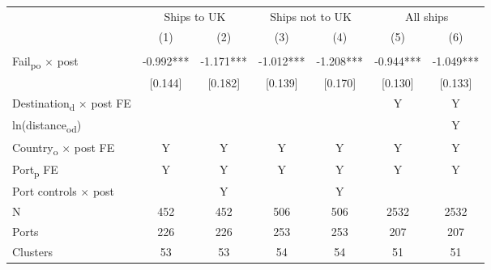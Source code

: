 {
\def\sym#1{\ifmmode^{#1}\else\(^{#1}\)\fi}
\begin{tabular}{l*{6}{c}}
\toprule
            &\multicolumn{2}{c}{Ships to UK}&\multicolumn{2}{c}{Ships not to UK}&\multicolumn{2}{c}{All ships}  \\\cmidrule(lr){2-3}\cmidrule(lr){4-5}\cmidrule(lr){6-7}
            &\multicolumn{1}{c}{(1)}   &\multicolumn{1}{c}{(2)}   &\multicolumn{1}{c}{(3)}   &\multicolumn{1}{c}{(4)}   &\multicolumn{1}{c}{(5)}   &\multicolumn{1}{c}{(6)}   \\
\midrule
            &               &               &               &               &               &               \\
Fail\textsubscript{po} $\times$ post&      -0.992***&      -1.171***&      -1.012***&      -1.208***&      -0.944***&      -1.049***\\
            &     [0.144]   &     [0.182]   &     [0.139]   &     [0.170]   &     [0.130]   &     [0.133]   \\
Destination\textsubscript{d} $\times$ post FE&               &               &               &               &           Y   &           Y   \\
ln(distance\textsubscript{od}) &               &               &               &               &               &           Y   \\
Country\textsubscript{o} $\times$ post FE&           Y   &           Y   &           Y   &           Y   &           Y   &           Y   \\
Port\textsubscript{p} FE &           Y   &           Y   &           Y   &           Y   &           Y   &           Y   \\
Port controls $\times$ post&               &           Y   &               &           Y   &               &               \\
\midrule
N           &         452   &         452   &         506   &         506   &        2532   &        2532   \\
Ports       &         226   &         226   &         253   &         253   &         207   &         207   \\
Clusters    &          53   &          53   &          54   &          54   &          51   &          51   \\
\bottomrule
\end{tabular}
}
